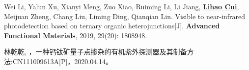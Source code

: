 \begin{enumerate}[{[1]}]
\item	Wei Li, Yalun Xu, Xianyi Meng, Zuo Xiao, Ruiming Li, Li Jiang, \textbf{\underline{Lihao Cui}}, Meijuan Zheng, Chang Liu, Liming Ding, Qianqian Lin. Visible to near-infrared photodetection based on ternary organic heterojunctions[J]. \textbf{Advanced Functional Materials}, 2019, 29(20): 1808948.

\item 林乾乾, {\bf{}}，一种钙钛矿量子点掺杂的有机紫外探测器及其制备方法:CN111009613A[P]，2020.04.14。

\end{enumerate}
\acknowledgement
